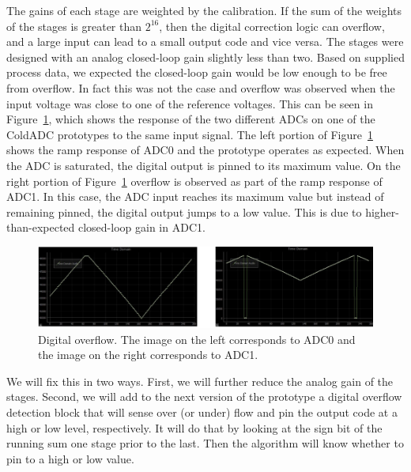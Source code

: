 \label{sec:5.9}


The gains of each stage are weighted by the calibration. If the sum of the weights of the stages is greater than $2^{16}$, then the digital correction logic can overflow, and a large input can lead to a small output code and vice versa. The stages were designed with an analog closed-loop gain slightly less than two. Based on supplied process data, we expected the closed-loop gain would be low enough to be free from overflow. In fact this was not the case and overflow was observed when the input voltage was close to one of the reference voltages. This can be seen in Figure~\ref{fig:adcoverflow}, which shows the response of the two different ADCs on one of the ColdADC prototypes to the same input signal. The left portion of Figure~\ref{fig:adcoverflow} shows the ramp response of ADC0 and the prototype operates as expected. When the ADC is saturated, the digital output is pinned to its maximum value. On the right portion of Figure~\ref{fig:adcoverflow} overflow is observed as part of the ramp response of ADC1. In this case, the ADC input reaches its maximum value but instead of remaining pinned, the digital output jumps to a low value. This is due to higher-than-expected closed-loop gain in ADC1.
\begin{figure}[htb]
\centering
\begin{center}
\includegraphics[width=1.0\textwidth]{figures/ADCOverflow.png}
\end{center}
\caption{Digital overflow. The image on the left corresponds to ADC0 and the image on the right corresponds to ADC1.}
\label{fig:adcoverflow}
\end{figure}

We will fix this in two ways. First, we will further reduce the analog gain of the stages. Second, we will add to the next version of the prototype a digital overflow detection block that will sense over (or under) flow and pin the output code at a high or low level, respectively. It will do that by looking at the sign bit of the running sum one stage prior to the last. Then the algorithm will know whether to pin to a high or low value.
